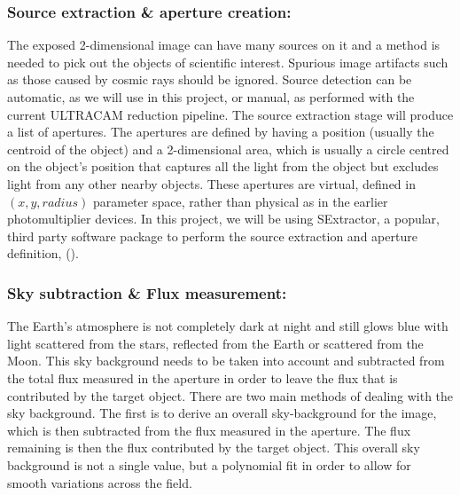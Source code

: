 \subsubsection{Source extraction \& aperture creation:}
The exposed 2-dimensional image can have many sources on it and a method is needed to pick out the objects of scientific interest. Spurious image artifacts such as those caused by cosmic rays should be ignored. Source detection can be automatic, as we will use in this project, or manual, as performed with the current ULTRACAM reduction pipeline. The source extraction stage will produce a list of apertures. The apertures are defined by having a position (usually the centroid of the object) and a 2-dimensional area, which is usually a circle centred on the object's position that captures all the light from the object but excludes light from any other nearby objects. These apertures are virtual, defined in $(x, y, radius)$ parameter space, rather than physical as in the earlier photomultiplier devices. In this project, we will be using {SExtractor}, a popular, third party software package to perform the source extraction and aperture definition, (\citep{bertin}).

\subsubsection{Sky subtraction \& Flux measurement:}
The Earth's atmosphere is not completely dark at night and still glows blue with light scattered from the stars, reflected from the Earth or scattered from the Moon. This sky background needs to be taken into account and subtracted from the total flux measured in the aperture in order to leave the flux that is contributed by the target object. There are two main methods of dealing with the sky background. The first is to derive an overall sky-background for the image, which is then subtracted from the flux measured in the aperture. The flux remaining is then the flux contributed by the target object. This overall sky background is not a single value, but a polynomial fit in order to allow for smooth variations across the field. 

